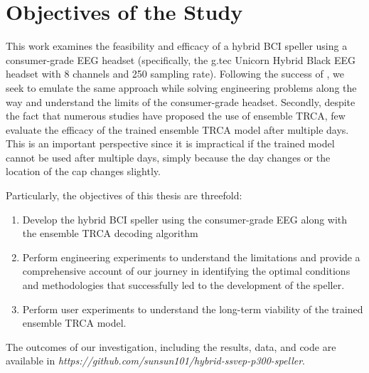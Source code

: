 \section{Objectives of the Study}

\begin{sloppypar}
This work examines the feasibility and efficacy of a hybrid BCI speller using a consumer-grade EEG headset (specifically, the g.tec Unicorn Hybrid Black EEG headset \cite{unicornbi} with 8 channels and 250 sampling rate).
Following the success of \cite{xu2020implementing}, we seek to emulate the same approach while solving engineering problems along the way and understand the limits of the consumer-grade headset. 
Secondly, despite the fact that numerous studies have proposed the use of ensemble TRCA, few evaluate the efficacy of the trained ensemble TRCA model after multiple days. 
This is an important perspective since it is impractical if the trained model cannot be used after multiple days, simply because the day changes or the location of the cap changes slightly.
\end{sloppypar}
Particularly, the objectives of this thesis are threefold:

\begin{enumerate}
    \item Develop the hybrid BCI speller using the consumer-grade EEG along with the ensemble TRCA decoding algorithm
    \item Perform engineering experiments to understand the limitations and provide a comprehensive account of our journey in identifying the optimal conditions and methodologies that successfully led to the development of the speller.
    \item Perform user experiments to understand the long-term viability of the trained ensemble TRCA model.
\end{enumerate}

The outcomes of our investigation, including the results, data, and code are available in \textit{https://github.com/sunsun101/hybrid-ssvep-p300-speller}.
